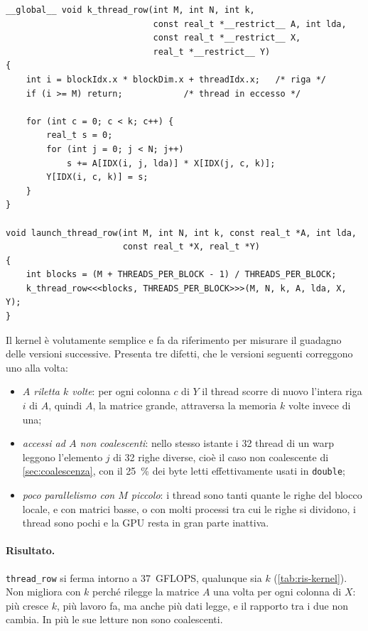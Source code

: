 \documentclass[11pt,a4paper]{article}
\begin{document}
\begin{lstlisting}[caption={Kernel e lancio di \texttt{thread\_row} (\texttt{kernel\_thread\_row.cu}).}, label={lst:thread-row}]
__global__ void k_thread_row(int M, int N, int k,
                             const real_t *__restrict__ A, int lda,
                             const real_t *__restrict__ X,
                             real_t *__restrict__ Y)
{
    int i = blockIdx.x * blockDim.x + threadIdx.x;   /* riga */
    if (i >= M) return;            /* thread in eccesso */

    for (int c = 0; c < k; c++) {
        real_t s = 0;
        for (int j = 0; j < N; j++)
            s += A[IDX(i, j, lda)] * X[IDX(j, c, k)];
        Y[IDX(i, c, k)] = s;
    }
}

void launch_thread_row(int M, int N, int k, const real_t *A, int lda,
                       const real_t *X, real_t *Y)
{
    int blocks = (M + THREADS_PER_BLOCK - 1) / THREADS_PER_BLOCK;
    k_thread_row<<<blocks, THREADS_PER_BLOCK>>>(M, N, k, A, lda, X, Y);
}
\end{lstlisting}

Il kernel è volutamente semplice e fa da riferimento per misurare il guadagno
delle versioni successive. Presenta tre difetti, che le versioni seguenti
correggono uno alla volta:
\begin{itemize}
  \item \emph{$A$ riletta $k$ volte}: per ogni colonna $c$ di $Y$ il thread
        scorre di nuovo l'intera riga $i$ di $A$, quindi $A$, la matrice
        grande, attraversa la memoria $k$ volte invece di una;
  \item \emph{accessi ad $A$ non coalescenti}: nello stesso istante i 32
        thread di un warp leggono l'elemento $j$ di 32 righe diverse, cioè il caso non coalescente di \cref{sec:coalescenza}, con il \SI{25}{\percent}
        dei byte letti effettivamente usati in \texttt{double};
  \item \emph{poco parallelismo con $M$ piccolo}: i thread sono tanti quante le
        righe del blocco locale, e con matrici basse, o con molti processi tra
        cui le righe si dividono, i thread sono pochi e la GPU resta in gran
        parte inattiva.
\end{itemize}

\paragraph{Risultato.} \texttt{thread\_row} si ferma intorno a 37~GFLOPS,
qualunque sia $k$ (\cref{tab:ris-kernel}). Non migliora con $k$ perché rilegge
la matrice $A$ una volta per ogni colonna di $X$: più cresce $k$, più lavoro
fa, ma anche più dati legge, e il rapporto tra i due non cambia. In più le sue
letture non sono coalescenti.
\end{document}
